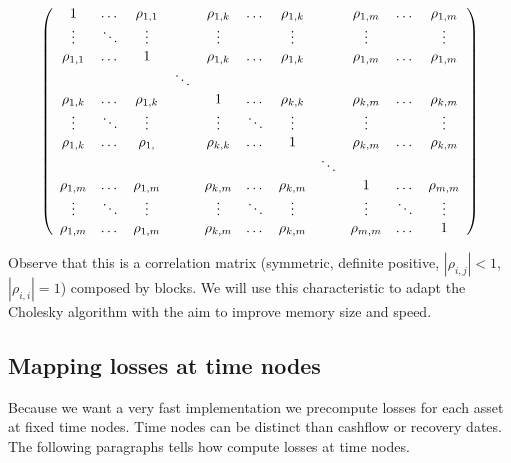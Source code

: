 \documentclass[a4paper,12pt,final]{article}
\begin{document}
\begin{displaymath}
\begin{array}{c}
\left(
\begin{array}{ccccccccccc}
1           & \dots    & \rho_{1,1}  &          & \rho_{1,k}  & \dots   & \rho_{1,k}  &         & \rho_{1,m}  & \dots      & \rho_{1,m}  \cr
\vdots      & \ddots   & \vdots      &          & \vdots      &         & \vdots      &         & \vdots      &            & \vdots      \cr
\rho_{1,1}  & \dots    & 1           &          & \rho_{1,k}  & \dots   & \rho_{1,k}  &         & \rho_{1,m}  & \dots      & \rho_{1,m}  \cr

            &          &             & \ddots   &             &         &             &         &             &            &             \cr

\rho_{1,k}  & \dots    & \rho_{1,k}  &          & 1           & \dots   & \rho_{k,k}  &         & \rho_{k,m}  & \dots      & \rho_{k,m}  \cr
\vdots      & \ddots   & \vdots      &          & \vdots      & \ddots  & \vdots      &         & \vdots      &            & \vdots      \cr
\rho_{1,k}  & \dots    & \rho_{1, }  &          & \rho_{k,k}  & \dots   & 1           &         & \rho_{k,m}  & \dots      & \rho_{k,m}  \cr

            &          &             &          &             &         &             & \ddots  &             &            &             \cr

\rho_{1,m}  & \dots    & \rho_{1,m}  &          & \rho_{k,m}  & \dots   & \rho_{k,m}  &         & 1           & \dots      & \rho_{m,m}  \cr
\vdots      & \ddots   & \vdots      &          & \vdots      & \ddots  & \vdots      &         & \vdots      & \ddots     & \vdots      \cr
\rho_{1,m}  & \dots    & \rho_{1,m}  &          & \rho_{k,m}  & \dots   & \rho_{k,m}  &         & \rho_{m,m}  & \dots      & 1           \end{array}
\right)
\end{array}
\end{displaymath}

Observe that this is a correlation matrix (symmetric, definite positive, 
$|\rho_{i,j}| < 1$, $|\rho_{i,i}| = 1$) composed by blocks. We will use this 
characteristic to adapt the Cholesky algorithm with the aim to improve memory 
size and speed.

\subsection{Mapping losses at time nodes}
Because we want a very fast implementation we precompute losses for each asset 
at fixed time nodes. Time nodes can be distinct than cashflow or recovery dates. 
The following paragraphs tells how compute losses at time nodes.
\end{document}
